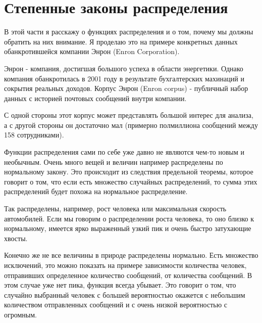 \section{Степенные законы распределения}

В этой части я расскажу о функциях распределения и о том, почему мы должны обратить на них внимание. Я проделаю это на примере конкретных данных обанкротившейся компании Энрон (Enron Corporation).

Энрон - компания, достигшая большого успеха в области энергетики. Однако компания обанкротилась в 2001 году в результате бухгалтерских махинаций и сокрытия реальных доходов\cite{enron_fall}. Корпус Энрон (Enron corpus) - публичный набор данных с историей почтовых сообщений внутри компании.

С одной стороны этот корпус может представлять большой интерес для анализа, а с другой стороны он достаточно мал (примерно полмиллиона сообщений между 158 сотрудниками\cite{sims_sinitsyn_matrix_structures}).

Функции распределения сами по себе уже давно не являются чем-то новым и необычным. Очень много вещей и величин например распределены по нормальному закону. Это происходит из следствия предельной теоремы, которое говорит о том, что если есть множество случайных распределений, то сумма этих распределений будет похожа на нормальное распределение. 

Так распределены, например, рост человека или максимальная скорость автомобилей. Если мы говорим о распределении роста человека, то оно близко к нормальному, имеется ярко выраженный узкий пик и очень быстро затухающие хвосты. 



Конечно же не все величины в природе распределены нормально. Есть множество исключений, это можно показать на примере зависимости количества человек, отправивших определенное количество сообщений, от количества сообщений. В этом случае уже нет пика, функция всегда убывает. Это говорит о том, что случайно выбранный человек с большей вероятностью окажется с небольшим количеством отправленных сообщений и с очень низкой вероятностью с огромным. 


